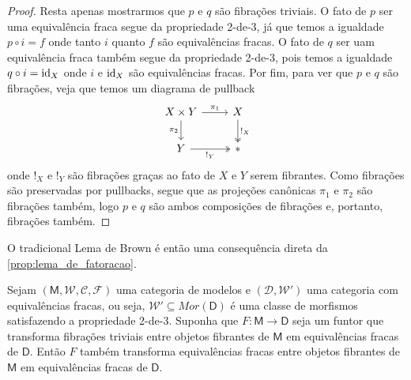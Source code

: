 \begin{proof}
  Resta apenas mostrarmos que $p$ e $q$ são fibrações triviais.
  O fato de $p$ ser uma equivalência fraca segue da propriedade 2-de-3, já que temos a igualdade $p \circ i = f$ onde tanto $i$ quanto $f$ são equivalências fracas.
  O fato de $q$ ser uam equivalência fraca também segue da propriedade 2-de-3, pois temos a igualdade $q \circ i = \mathrm{id}_{X}$ onde $i$ e $\mathrm{id}_{X}$ são equivalências fracas.
  Por fim, para ver que $p$ e $q$ são fibrações, veja que temos um diagrama de pullback
  \begin{displaymath}
    \begin{tikzcd}
      X \times Y
      \arrow[r, "\pi_{1}"]
      \arrow[d, "\pi_{2}" swap]
      & X
      \arrow[d, two heads, "!_{X}"]
      \\ Y
      \arrow[r, two heads, "!_{Y}" swap]
      & *
    \end{tikzcd}
  \end{displaymath}
  onde $!_{X}$ e $!_{Y}$ são fibrações graças ao fato de $X$ e $Y$ serem fibrantes.
  Como fibrações são preservadas por pullbacks, segue que as projeções canônicas $\pi_{1}$ e $\pi_{2}$ são fibrações também, logo $p$ e $q$ são ambos composições de fibrações e, portanto, fibrações também.
\end{proof}

O tradicional Lema de Brown é então uma consequência direta da \cref{prop:lema_de_fatoracao}.

\begin{corol}
  \label{corol:lema_de_brown}
  Sejam $(\mathsf{M},\mathcal{W},\mathcal{C},\mathcal{F})$ uma categoria de modelos e $(\mathcal{D},\mathcal{W}')$ uma categoria com equivalências fracas, ou seja, $\mathcal{W}' \subseteq Mor(\mathsf{D})$ é uma classe de morfismos satisfazendo a propriedade 2-de-3.
  Suponha que $F: \mathsf{M} \to \mathsf{D}$ seja um funtor que transforma fibrações triviais entre objetos fibrantes de $\mathsf{M}$ em equivalências fracas de $\mathsf{D}$.
  Então $F$ também transforma equivalências fracas entre objetos fibrantes de $\mathsf{M}$ em equivalências fracas de $\mathsf{D}$.
\end{corol}

